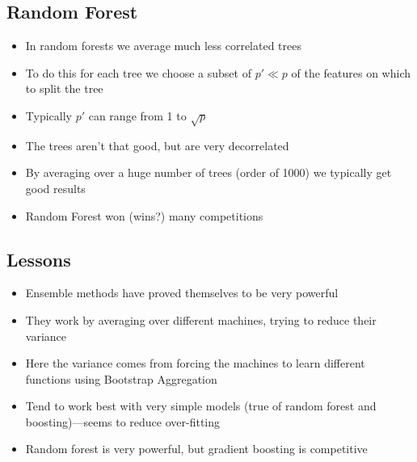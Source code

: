 
\begin{slide}
\section{Random Forest}

\begin{PauseHighLight}
  \begin{itemize}
  \item In random forests we average much less correlated trees\pause
  \item To do this for each tree we choose a subset of $p'\ll p$ of the
    features on which to split the tree\pause
  \item Typically $p'$ can range from 1 to $\sqrt{p}$\pause
  \item The trees aren't that good, but are very decorrelated\pause
  \item By averaging over a huge number of trees (order of 1000) we
    typically get good results\pause
  \item Random Forest won (wins?) many competitions\pause
  \end{itemize}
\end{PauseHighLight}

\end{slide}


\begin{slide}
\section{Lessons}

\begin{PauseHighLight}
  \begin{itemize}
  \item Ensemble methods have proved themselves to be very
    powerful\pause
  \item They work by averaging over different machines, trying to
    reduce their variance\pause
  \item Here the variance comes from forcing the machines to learn
    different functions using Bootstrap Aggregation\pause
  \item Tend to work best with very simple models (true of random forest
    and boosting)\pause---seems to reduce over-fitting\pause
  \item Random forest is very powerful, but gradient boosting is competitive\pause
  \end{itemize}
\end{PauseHighLight}

\end{slide}


